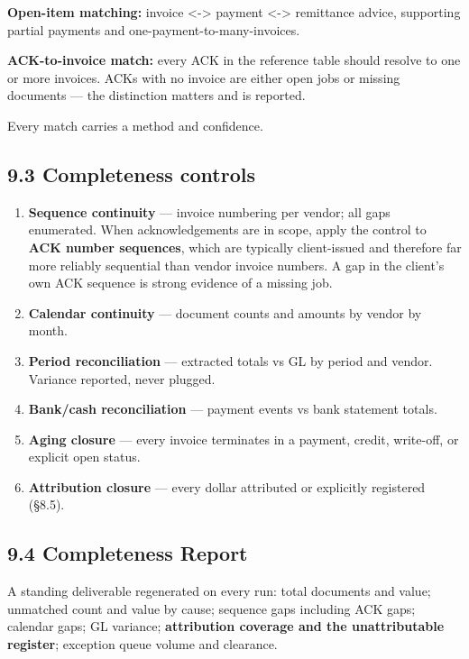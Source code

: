 \documentclass[
]{article}
\providecommand{\tightlist}{%
  \setlength{\itemsep}{0pt}\setlength{\parskip}{0pt}}
\begin{document}
\textbf{Open-item matching:} invoice \textless-\textgreater{} payment
\textless-\textgreater{} remittance advice, supporting partial payments
and one-payment-to-many-invoices.

\textbf{ACK-to-invoice match:} every ACK in the reference table should
resolve to one or more invoices. ACKs with no invoice are either open
jobs or missing documents --- the distinction matters and is reported.

Every match carries a method and confidence.

\subsection{9.3 Completeness controls}\label{completeness-controls}

\begin{enumerate}
\def\labelenumi{\arabic{enumi}.}
\tightlist
\item
  \textbf{Sequence continuity} --- invoice numbering per vendor; all
  gaps enumerated. When acknowledgements are in scope, apply the control
  to \textbf{ACK number sequences}, which are typically client-issued
  and therefore far more reliably sequential than vendor invoice
  numbers. A gap in the client's own ACK sequence is strong evidence of
  a missing job.
\item
  \textbf{Calendar continuity} --- document counts and amounts by vendor
  by month.
\item
  \textbf{Period reconciliation} --- extracted totals vs GL by period
  and vendor. Variance reported, never plugged.
\item
  \textbf{Bank/cash reconciliation} --- payment events vs bank statement
  totals.
\item
  \textbf{Aging closure} --- every invoice terminates in a payment,
  credit, write-off, or explicit open status.
\item
  \textbf{Attribution closure} --- every dollar attributed or explicitly
  registered (§8.5).
\end{enumerate}

\subsection{9.4 Completeness Report}\label{completeness-report}

A standing deliverable regenerated on every run: total documents and
value; unmatched count and value by cause; sequence gaps including ACK
gaps; calendar gaps; GL variance; \textbf{attribution coverage and the
unattributable register}; exception queue volume and clearance.
\end{document}
